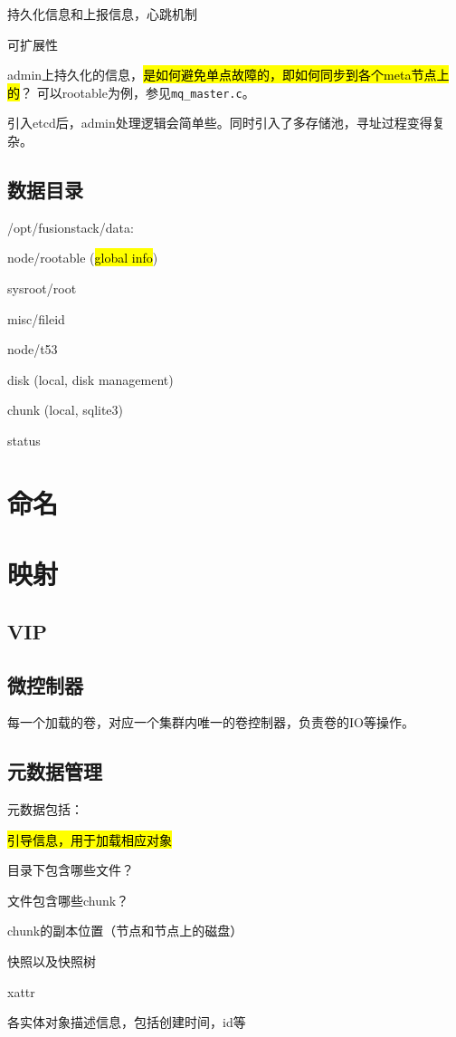 持久化信息和上报信息，心跳机制

可扩展性

admin上持久化的信息，\hl{是如何避免单点故障的，即如何同步到各个meta节点上的}？
可以rootable为例，参见\verb|mq_master.c|。

引入etcd后，admin处理逻辑会简单些。同时引入了多存储池，寻址过程变得复杂。

\subsection{数据目录}

/opt/fusionstack/data:
\begin{itembox}
\item node/rootable (\hl{global info})
    \begin{compactitem}
    \item sysroot/root
    \item misc/fileid
    \item node/t53
    \end{compactitem}
\item disk (local, disk management)
\item chunk (local, sqlite3)
\item status
\end{itembox}

\section{命名}

\section{映射}

\subsection{VIP}

\subsection{微控制器}

每一个加载的卷，对应一个集群内唯一的卷控制器，负责卷的IO等操作。

\subsection{元数据管理}

元数据包括：
\begin{enumbox}
\item \hl{引导信息，用于加载相应对象}
\item 目录下包含哪些文件？
\item 文件包含哪些chunk？
\item chunk的副本位置（节点和节点上的磁盘）
\item 快照以及快照树
\item xattr
\item 各实体对象描述信息，包括创建时间，id等
\end{enumbox}

